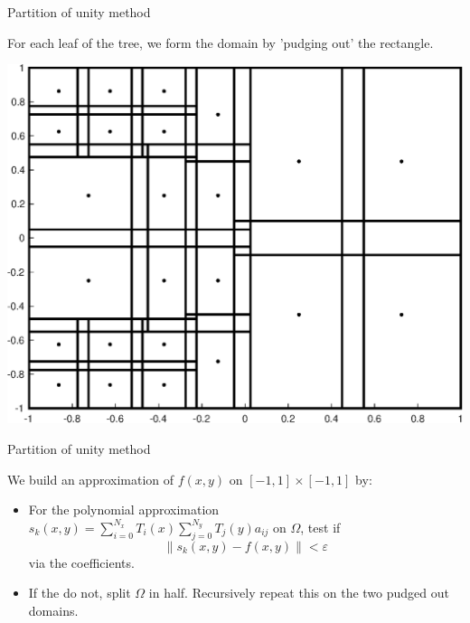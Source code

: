 \documentclass{beamer}
\begin{document}
\begin{frame}{Partition of unity method}

For each leaf of the tree, we form the domain by 'pudging out' the rectangle.
\bigskip

\begin{center}
\includegraphics[scale = 0.4]{domainPlot.eps}
\end{center}
\end{frame}

\begin{frame}{Partition of unity method}

We build an approximation of $f(x,y)$ on $[-1,1] \times [-1,1]$ by:
\bigskip
\begin{itemize}
\item For the polynomial approximation $s_k(x,y)=\sum_{i=0}^{N_x} T_i(x) \sum_{j=0}^{N_y} T_j(y)a_{ij}$ on $\Omega$, test if 
$$\|s_k(x,y) - f(x,y) \| < \varepsilon $$
via the coefficients.
\item If the do not, split $\Omega$ in half. Recursively repeat this on the two pudged out domains.
\end{itemize}

\end{frame}
\end{document}
